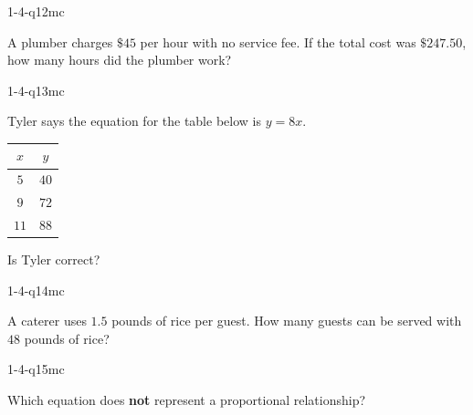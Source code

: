 \begin{practiceQuestion}{1-4-q12}{mc}
\begin{questionText}
A plumber charges $\$45$ per hour with no service fee. If the total cost was $\$247.50$, how many hours did the plumber work?
\end{questionText}
\end{practiceQuestion}

\begin{practiceQuestion}{1-4-q13}{mc}
\begin{questionText}
Tyler says the equation for the table below is $y = 8x$.

\begin{center}
\begin{tabular}{|c|c|}
\hline
$x$ & $y$ \\
\hline
$5$ & $40$ \\
$9$ & $72$ \\
$11$ & $88$ \\
\hline
\end{tabular}
\end{center}

Is Tyler correct?
\end{questionText}
\end{practiceQuestion}

\begin{practiceQuestion}{1-4-q14}{mc}
\begin{questionText}
A caterer uses $1.5$ pounds of rice per guest. How many guests can be served with $48$ pounds of rice?
\end{questionText}
\end{practiceQuestion}

\begin{practiceQuestion}{1-4-q15}{mc}
\begin{questionText}
Which equation does \textbf{not} represent a proportional relationship?
\end{questionText}
\end{practiceQuestion}


